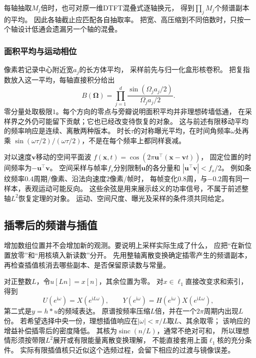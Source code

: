 每轴抽取$M_j$倍时，也可对原一维DTFT混叠式逐轴换元，
得到$\prod_jM_j$个频谱副本的平均。
因此各轴截止应匹配各自抽取率。
把宽、高压缩到不同倍数时，只按一个轴设计低通会遗漏另一个轴的混叠。

\subsubsection{面积平均与运动相位}
像素若记录中心附近宽$a_j$的长方体平均，
采样前先与归一化盒形核卷积。
把复指数放入这一平均，每轴直接积分给出
\begin{equation}
 B(\bm\Omega)=
 \prod_{j=1}^d\frac{\sin(\Omega_ja_j/2)}{\Omega_ja_j/2}.
 \label{eq:signal-box-aperture-response}
\end{equation}
零分量处取极限$1$。每个方向的零点与旁瓣说明面积平均并非理想砖墙低通，
在采样界之外仍可能留下贡献；它也已经改变待恢复的对象。
这与前述有限移动平均的频率响应是连续、离散两种版本。
时长$\tau$的对称曝光平均，在时间角频率$\omega$处再乘
$\sin(\omega\tau/2)/(\omega\tau/2)$，不是在每个频率上都同样衰减。

对以速度$\bm v$移动的空间平面波
$f(\bm x,t)=\cos(2\pi\bm u^\top(\bm x-\bm v t))$，
固定位置的时间频率为$-\bm u^\top\bm v$。
空间采样与帧率$f_s$分别限制$\bm u$的各分量和
$|\bm u^\top\bm v|<f_s/2$。
例如条纹频率$0.4$周期/像素、沿法向速度$2$像素/帧时，
每帧变化$0.8$周，与$-0.2$周有同一样本，表观运动可能反向。
这些余弦是用来展示歧义的功率信号，不属于前述整轴$L^2$恢复定理的对象。
运动、空间尺度、曝光及采样的条件须共同给定。

\subsection{插零后的频谱与插值}
\label{sec:signal-upsampling-interpolation}

增加数组位置并不会增加新的观测。要说明上采样实际生成了什么，
应把“在新位置放零”和“用核填入新读数”分开。
先用整轴离散变换确定插零产生的频谱副本，
再检查插值核消去哪些副本、是否保留原读数与常量。

对正整数$L$，令$u[Ln]=x[n]$，其余位置为零。
对$x\in\ell_1$直接改变求和索引，得到
\begin{equation}
 U(e^{\mathrm i\omega})=X(e^{\mathrm iL\omega}),\qquad
 Y(e^{\mathrm i\omega})=H(e^{\mathrm i\omega})X(e^{\mathrm iL\omega}),
 \label{eq:signal-upsampling-spectrum}
\end{equation}
第二式是$y=h*u$的频域表达。
原谱按频率压缩$L$倍，并在一个$2\pi$周期内出现$L$份。
若希望选择中央一份，理想插值响应在$|\omega|<\pi/L$取$L$、其余取零；
该响应的增益补偿插零后的密度降低。
其核为$\operatorname{sinc}(n/L)$，通常不绝对可和，
所以理想情形须按带限$L^2$展开或有限能量离散变换理解，
不能直接套用上面$\ell_1$核的充分条件。
实际有限插值核只近似这个选频过程，会留下相应的过渡与镜像误差。

